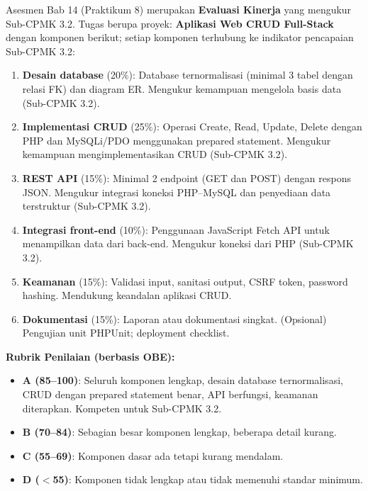 \documentclass[../main.tex]{subfiles}
\begin{document}
\begin{asesmen}
Asesmen Bab 14 (Praktikum 8) merupakan \textbf{Evaluasi Kinerja} yang mengukur Sub-CPMK 3.2. Tugas berupa proyek: \textbf{Aplikasi Web CRUD Full-Stack} dengan komponen berikut; setiap komponen terhubung ke indikator pencapaian Sub-CPMK 3.2:

\begin{enumerate}
  \item \textbf{Desain database} (20\%): Database ternormalisasi (minimal 3 tabel dengan relasi FK) dan diagram ER. Mengukur kemampuan mengelola basis data (Sub-CPMK 3.2).
  \item \textbf{Implementasi CRUD} (25\%): Operasi Create, Read, Update, Delete dengan PHP dan MySQLi/PDO menggunakan prepared statement. Mengukur kemampuan mengimplementasikan CRUD (Sub-CPMK 3.2).
  \item \textbf{REST API} (15\%): Minimal 2 endpoint (GET dan POST) dengan respons JSON. Mengukur integrasi koneksi PHP--MySQL dan penyediaan data terstruktur (Sub-CPMK 3.2).
  \item \textbf{Integrasi front-end} (10\%): Penggunaan JavaScript Fetch API untuk menampilkan data dari back-end. Mengukur koneksi dari PHP (Sub-CPMK 3.2).
  \item \textbf{Keamanan} (15\%): Validasi input, sanitasi output, CSRF token, password hashing. Mendukung keandalan aplikasi CRUD.
  \item \textbf{Dokumentasi} (15\%): Laporan atau dokumentasi singkat. (Opsional) Pengujian unit PHPUnit; deployment checklist.
\end{enumerate}

\textbf{Rubrik Penilaian (berbasis OBE):}
\begin{itemize}
  \item \textbf{A (85--100)}: Seluruh komponen lengkap, desain database ternormalisasi, CRUD dengan prepared statement benar, API berfungsi, keamanan diterapkan. Kompeten untuk Sub-CPMK 3.2.
  \item \textbf{B (70--84)}: Sebagian besar komponen lengkap, beberapa detail kurang.
  \item \textbf{C (55--69)}: Komponen dasar ada tetapi kurang mendalam.
  \item \textbf{D ($<$55)}: Komponen tidak lengkap atau tidak memenuhi standar minimum.
\end{itemize}
\end{asesmen}
\end{document}
